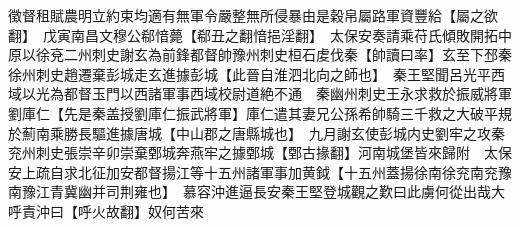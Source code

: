徵督租賦農明立約束均適有無軍令嚴整無所侵暴由是穀帛屬路軍資豐給【屬之欲翻】　戊寅南昌文穆公郗愔薨【郗丑之翻愔挹淫翻】　太保安奏請乘苻氏傾敗開拓中原以徐兗二州刺史謝玄為前鋒都督帥豫州刺史桓石䖍伐秦【帥讀曰率】玄至下邳秦徐州刺史趙遷棄彭城走玄進據彭城【此晉自淮泗北向之師也】　秦王堅聞呂光平西域以光為都督玉門以西諸軍事西域校尉道絶不通　秦幽州刺史王永求救於振威將軍劉庫仁【先是秦盖授劉庫仁振武將軍】庫仁遣其妻兄公孫希帥騎三千救之大破平規於薊南乘勝長驅進據唐城【中山郡之唐縣城也】　九月謝玄使彭城内史劉牢之攻秦兖州刺史張崇辛卯崇棄鄄城奔燕牢之據鄄城【鄄古掾翻】河南城堡皆來歸附　太保安上疏自求北征加安都督揚江等十五州諸軍事加黄鉞【十五州蓋揚徐南徐兖南兖豫南豫江青冀幽并司荆雍也】　慕容沖進逼長安秦王堅登城觀之歎曰此虜何從出哉大呼責沖曰【呼火故翻】奴何苦來